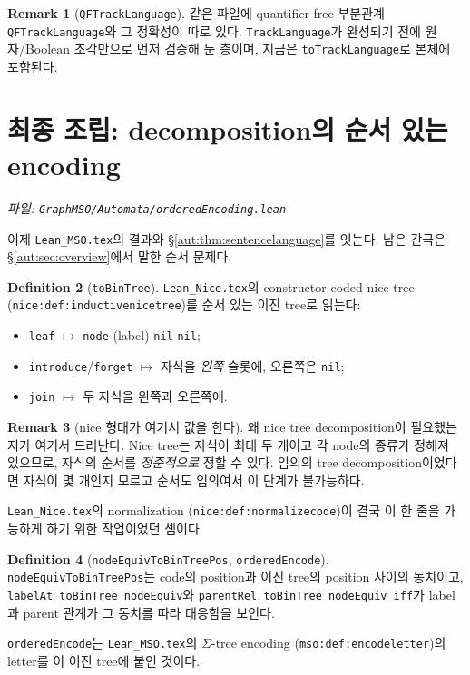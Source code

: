 \documentclass[11pt]{article}
\theoremstyle{definition}
\newtheorem{definition}{Definition}[section]
\newtheorem{remark}[definition]{Remark}
\theoremstyle{plain}
\newcommand{\lean}[1]{\texttt{#1}}
\newcommand{\leanfile}[1]{\texttt{#1}}
\begin{document}
\begin{remark}[\lean{QFTrackLanguage}]
같은 파일에 quantifier-free 부분관계 \lean{QFTrackLanguage}와 그 정확성이
따로 있다. \lean{TrackLanguage}가 완성되기 전에 원자/Boolean 조각만으로
먼저 검증해 둔 층이며, 지금은 \lean{toTrackLanguage}로 본체에 포함된다.
\end{remark}

\section{최종 조립: decomposition의 순서 있는 encoding}
\label{aut:sec:orderedencoding}

\emph{파일: \leanfile{GraphMSO/Automata/orderedEncoding.lean}}

이제 \leanfile{Lean\_MSO.tex}의 결과와 \S\ref{aut:thm:sentencelanguage}를
잇는다. 남은 간극은 \S\ref{aut:sec:overview}에서 말한 순서 문제다.

\begin{definition}[\lean{toBinTree}]
\label{aut:def:tobintree}
\leanfile{Lean\_Nice.tex}의 constructor-coded nice tree
(\lean{nice:def:inductivenicetree})를 순서 있는 이진 tree로 읽는다:
\begin{itemize}
  \item \lean{leaf} $\mapsto$ \lean{node} (label) \lean{nil} \lean{nil};
  \item \lean{introduce}/\lean{forget} $\mapsto$ 자식을 \emph{왼쪽} 슬롯에,
    오른쪽은 \lean{nil};
  \item \lean{join} $\mapsto$ 두 자식을 왼쪽과 오른쪽에.
\end{itemize}
\end{definition}

\begin{remark}[nice 형태가 여기서 값을 한다]
왜 nice tree decomposition이 필요했는지가 여기서 드러난다. Nice tree는 자식이
최대 두 개이고 각 node의 종류가 정해져 있으므로, 자식의 순서를 \emph{정준적으로}
정할 수 있다. 임의의 tree decomposition이었다면 자식이 몇 개인지 모르고
순서도 임의여서 이 단계가 불가능하다.

\leanfile{Lean\_Nice.tex}의 normalization
(\lean{nice:def:normalizecode})이 결국 이 한 줄을 가능하게 하기 위한
작업이었던 셈이다.
\end{remark}

\begin{definition}[\lean{nodeEquivToBinTreePos}, \lean{orderedEncode}]
\label{aut:def:orderedencode}
\lean{nodeEquivToBinTreePos}는 code의 position과 이진 tree의 position 사이의
동치이고, \lean{labelAt\_toBinTree\_nodeEquiv}와
\lean{parentRel\_toBinTree\_nodeEquiv\_iff}가 label과 parent 관계가 그
동치를 따라 대응함을 보인다.

\lean{orderedEncode}는 \leanfile{Lean\_MSO.tex}의 $\Sigma$-tree encoding
(\lean{mso:def:encodeletter})의 letter를 이 이진 tree에 붙인 것이다.
\end{definition}
\end{document}
